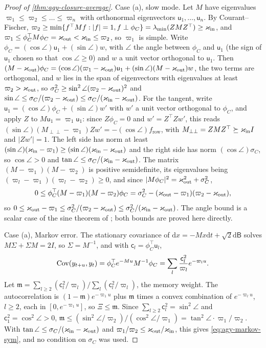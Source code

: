 \begin{proof}[Proof of \cref{thm:agy-closure-average}]
Case (a), slow mode. Let $M$ have eigenvalues $\varpi_1\le\varpi_2\le\dots\le\varpi_n$ with orthonormal eigenvectors $\mathsf u_1,\dots,\mathsf u_n$. By Courant--Fischer, $\varpi_2\ge\min\{f^\top Mf:\lvert f\rvert=1,f\perp\phi_C\}=\lambda_{\min}(ZMZ^\top)\ge\varkappa_{\mathrm{in}}$, and $\varpi_1\le\phi_C^\top M\phi_C=\varkappa_{\mathrm{out}}<\varkappa_{\mathrm{in}}\le\varpi_2$, so $\varpi_1$ is simple. Write $\phi_C=(\cos\angle)\mathsf u_1+(\sin\angle)w$, with $\angle$ the angle between $\phi_C$ and $\mathsf u_1$ (the sign of $\mathsf u_1$ chosen so that $\cos\angle\ge0$) and $w$ a unit vector orthogonal to $\mathsf u_1$. Then $(M-\varkappa_{\mathrm{out}})\phi_C=(\cos\angle)(\varpi_1-\varkappa_{\mathrm{out}})\mathsf u_1+(\sin\angle)(M-\varkappa_{\mathrm{out}})w$, the two terms are orthogonal, and $w$ lies in the span of eigenvectors with eigenvalues at least $\varpi_2>\varkappa_{\mathrm{out}}$, so $\sigma_C^2\ge\sin^2\angle(\varpi_2-\varkappa_{\mathrm{out}})^2$ and $\sin\angle\le\sigma_C/(\varpi_2-\varkappa_{\mathrm{out}})\le\sigma_C/(\varkappa_{\mathrm{in}}-\varkappa_{\mathrm{out}})$. For the tangent, write $\mathsf u_1=(\cos\angle)\phi_C+(\sin\angle)w'$ with $w'$ a unit vector orthogonal to $\phi_C$, and apply $Z$ to $M\mathsf u_1=\varpi_1\mathsf u_1$: since $Z\phi_C=0$ and $w'=Z^\top Zw'$, this reads $(\sin\angle)(M_{\perp\perp}-\varpi_1)Zw'=-(\cos\angle)f_{\mathrm{row}}$, with $M_{\perp\perp}=ZMZ^\top\succeq\varkappa_{\mathrm{in}} I$ and $\lvert Zw'\rvert=1$. The left side has norm at least $(\sin\angle)(\varkappa_{\mathrm{in}}-\varpi_1)\ge(\sin\angle)(\varkappa_{\mathrm{in}}-\varkappa_{\mathrm{out}})$ and the right side has norm $(\cos\angle)\sigma_C$, so $\cos\angle>0$ and $\tan\angle\le\sigma_C/(\varkappa_{\mathrm{in}}-\varkappa_{\mathrm{out}})$. The matrix $(M-\varpi_1)(M-\varpi_2)$ is positive semidefinite, its eigenvalues being $(\varpi_l-\varpi_1)(\varpi_l-\varpi_2)\ge0$, and since $\lvert M\phi_C\rvert^2=\varkappa_{\mathrm{out}}^2+\sigma_C^2$,
\begin{equation*}
0\le\phi_C^\top(M-\varpi_1)(M-\varpi_2)\phi_C=\sigma_C^2-(\varkappa_{\mathrm{out}}-\varpi_1)(\varpi_2-\varkappa_{\mathrm{out}}),
\end{equation*}
so $0\le\varkappa_{\mathrm{out}}-\varpi_1\le\sigma_C^2/(\varpi_2-\varkappa_{\mathrm{out}})\le\sigma_C^2/(\varkappa_{\mathrm{in}}-\varkappa_{\mathrm{out}})$. The angle bound is a scalar case of the sine theorem of \citet{davis1970rotation}; both bounds are proved here directly.

Case (a), Markov error. The stationary covariance of $\mathrm dx=-Mx\mathrm dt+\sqrt2\mathrm d\mathsf B$ solves $M\Sigma+\Sigma M=2I$, so $\Sigma=M^{-1}$, and with $\mathsf c_l=\phi_C^\top\mathsf u_l$,
\begin{equation*}
\operatorname{Cov}(y_{t+u},y_t)=\phi_C^\top e^{-Mu}M^{-1}\phi_C=\sum_l\frac{\mathsf c_l^2}{\varpi_l}e^{-\varpi_lu}.
\end{equation*}
Let $\mathfrak m=\sum_{l\ge2}(\mathsf c_l^2/\varpi_l)/\sum_l(\mathsf c_l^2/\varpi_l)$, the memory weight. The autocorrelation is $(1-\mathfrak m)e^{-\varpi_1u}$ plus $\mathfrak m$ times a convex combination of $e^{-\varpi_lu}$, $l\ge2$, each in $[0,e^{-\varpi_1u}]$, so $\Xi\le\mathfrak m$. Since $\sum_{l\ge2}\mathsf c_l^2=\sin^2\angle$ and $\mathsf c_1^2=\cos^2\angle>0$, $\mathfrak m\le(\sin^2\angle/\varpi_2)/(\cos^2\angle/\varpi_1)=\tan^2\angle\cdot\varpi_1/\varpi_2$. With $\tan\angle\le\sigma_C/(\varkappa_{\mathrm{in}}-\varkappa_{\mathrm{out}})$ and $\varpi_1/\varpi_2\le\varkappa_{\mathrm{out}}/\varkappa_{\mathrm{in}}$, this gives \eqref{eq:agy-markov-sym}, and no condition on $\sigma_C$ was used.


\end{proof}
